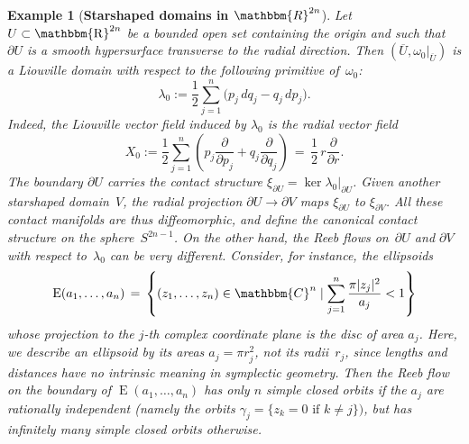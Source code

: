 \documentclass[12pt,twoside]{amsart}
\theoremstyle{plain}
\newtheorem{example}[theorem]{Example}
\numberwithin{figure}{section}
\numberwithin{equation}{section}
\def\E{\operatorname{E}}
\def\CC{\mathbbm{C}}
\def\RR{\mathbbm{R}}
\def\R{\operatorname{\mathbbm{R}}}
\def\pp{\partial}
\begin{document}
\begin{example}[\bf Starshaped domains in $\RR^{2n}$] \label{ex:star}
{\rm
Let $U \subset \R^{2n}$ be a bounded open set containing the origin and such that $\partial U$ is a smooth hypersurface transverse to the radial direction. Then $(\overline{U},\omega_0|_{\overline U})$ is a Liouville domain with respect to the following primitive of~$\omega_0$:
\[
\lambda_0 := \frac{1}{2} \sum_{j=1}^n \bigl( p_j \, dq_j - q_j \, dp_j \bigr).
\]
Indeed, the Liouville vector field induced by $\lambda_0$ is the radial vector field
\[
X_0 := \frac{1}{2} \sum_{j=1}^n \left( p_j \frac{\partial}{\partial p_j} + q_j \frac{\partial}{\partial q_j} \right) \,=\, \frac 12 \,r \frac{\partial}{\partial r} .
\]
The boundary $\pp U$ carries the contact structure $\xi_{\pp U} = \ker \lambda_0 |_{\pp U}$.
Given another starshaped domain~$V$, the radial projection $\pp U \to \pp V$ maps $\xi_{\pp U}$ to $\xi_{\pp V}$.
All these contact manifolds are thus diffeomorphic, 
and define the canonical contact structure on the sphere~$S^{2n-1}$.
On the other hand, the Reeb flows on~$\pp U$ and $\pp V$ with respect to~$\lambda_0$ can be
very different. Consider, for instance, the ellipsoids
\begin{equation}
\label{ellipsoid}
\E (a_1, \dots, a_n) \,=\, 
\left\{ (z_1, \dots, z_n) \in \CC^n \mid \sum_{j=1}^n \frac{\pi |z_j|^2}{a_j} < 1 \right\} 
\end{equation}
whose projection to the $j$-th complex coordinate plane is the disc of area $a_j$.
Here, we describe an ellipsoid by its areas $a_j= \pi r_j^2$, not its radii~$r_j$, 
since lengths and distances have no intrinsic meaning in symplectic geometry.
Then the Reeb flow on the boundary of $\E (a_1, \dots, a_n)$ has only $n$ simple closed orbits
if the $a_j$ are rationally independent 
(namely the orbits $\gamma_j = \{ z_k = 0 \mbox{ if } k \neq j \})$, 
but has infinitely many simple closed orbits otherwise.
}
\end{example}
\end{document}

